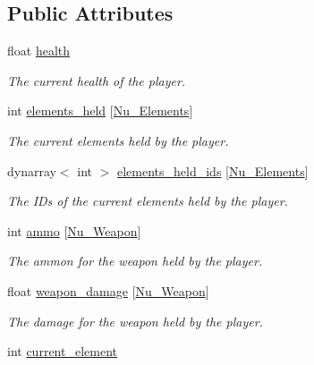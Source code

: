 \subsection*{Public Attributes}
\begin{DoxyCompactItemize}
\item 
float \hyperlink{structoctet_1_1_player_a2bdd50ed81043241cc239cd858e6fabb}{health}
\begin{DoxyCompactList}\small\item\em The current health of the player. \end{DoxyCompactList}\item 
int \hyperlink{structoctet_1_1_player_a52efa1d95f5bdf41f0fe427339b55801}{elements\+\_\+held} \mbox{[}\hyperlink{minecraft__wars_8h_a6e7de24a0c77478471e22ff642696cba}{Nu\+\_\+\+Elements}\mbox{]}
\begin{DoxyCompactList}\small\item\em The current elements held by the player. \end{DoxyCompactList}\item 
dynarray$<$ int $>$ \hyperlink{structoctet_1_1_player_a7d368ab73cce8c40a836e0b14a858c6c}{elements\+\_\+held\+\_\+ids} \mbox{[}\hyperlink{minecraft__wars_8h_a6e7de24a0c77478471e22ff642696cba}{Nu\+\_\+\+Elements}\mbox{]}
\begin{DoxyCompactList}\small\item\em The I\+Ds of the current elements held by the player. \end{DoxyCompactList}\item 
int \hyperlink{structoctet_1_1_player_a2076979db0f255de49747f1cfc0d2c56}{ammo} \mbox{[}\hyperlink{minecraft__wars_8h_acb18bb521c73ece6bfc2790c9bb0a83a}{Nu\+\_\+\+Weapon}\mbox{]}
\begin{DoxyCompactList}\small\item\em The ammon for the weapon held by the player. \end{DoxyCompactList}\item 
float \hyperlink{structoctet_1_1_player_aea38c028487f7b6049478fa68cc9a493}{weapon\+\_\+damage} \mbox{[}\hyperlink{minecraft__wars_8h_acb18bb521c73ece6bfc2790c9bb0a83a}{Nu\+\_\+\+Weapon}\mbox{]}
\begin{DoxyCompactList}\small\item\em The damage for the weapon held by the player. \end{DoxyCompactList}\item 
int \hyperlink{structoctet_1_1_player_a2ec6d4e522ec40035a3ab5a3389147fe}{current\+\_\+element}

\end{DoxyCompactItemize}
